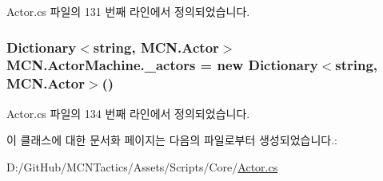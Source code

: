 Actor.\+cs 파일의 131 번째 라인에서 정의되었습니다.

\subsubsection[{\texorpdfstring{\+\_\+actors}{_actors}}]{\setlength{\rightskip}{0pt plus 5cm}Dictionary$<$string, {\bf M\+C\+N.\+Actor}$>$ M\+C\+N.\+Actor\+Machine.\+\_\+actors = new Dictionary$<$string, {\bf M\+C\+N.\+Actor}$>$()\hspace{0.3cm}{\ttfamily [private]}}\hypertarget{class_m_c_n_1_1_actor_machine_a4e38488fdd2af93cc62e2b8fd6d4dc2c}{}\label{class_m_c_n_1_1_actor_machine_a4e38488fdd2af93cc62e2b8fd6d4dc2c}


Actor.\+cs 파일의 134 번째 라인에서 정의되었습니다.



이 클래스에 대한 문서화 페이지는 다음의 파일로부터 생성되었습니다.\+:\begin{DoxyCompactItemize}
\item 
D\+:/\+Git\+Hub/\+M\+C\+N\+Tactics/\+Assets/\+Scripts/\+Core/\hyperlink{_actor_8cs}{Actor.\+cs}\end{DoxyCompactItemize}
